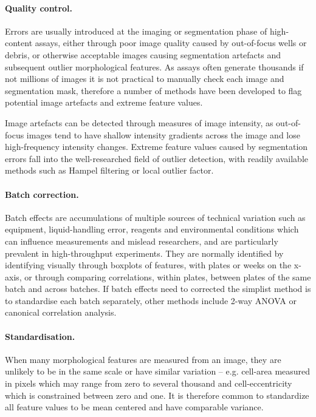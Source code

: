 \documentclass[a4paper,11pt,twoside,openright]{scrbook}
\begin{document}
\paragraph{\textbf{Quality control.}}
Errors are usually introduced at the imaging or segmentation phase of high-content assays, either through poor image quality caused by out-of-focus wells or debris, or otherwise acceptable images causing segmentation artefacts and subsequent outlier morphological features.
As assays often generate thousands if not millions of images it is not practical to manually check each image and segmentation mask, therefore a number of methods have been developed to flag potential image artefacts and extreme feature values.

Image artefacts can be detected through measures of image intensity, as out-of-focus images tend to have shallow intensity gradients across the image and lose high-frequency intensity changes. \cite{Bray2012}
Extreme feature values caused by segmentation errors fall into the well-researched field of outlier detection, with readily available methods such as Hampel filtering \cite{Hampel1974} or local outlier factor. \cite{Breunig2000}

\paragraph{Batch correction.}
Batch effects are accumulations of multiple sources of technical variation such as equipment, liquid-handling error, reagents and environmental conditions which can influence measurements and mislead researchers, and are particularly prevalent in high-throughput experiments.
They are normally identified by identifying visually through boxplots of features, with plates or weeks on the x-axis, or through comparing correlations, within plates, between plates of the same batch and across batches.
If batch effects need to corrected the simplist method is to standardise each batch separately, other methods include 2-way ANOVA \cite{Nygaard2016} or canonical correlation analysis. \cite{Vaisipour2014}

\paragraph{Standardisation.}
When many morphological features are measured from an image, they are unlikely to be in the same scale or have similar variation -- e.g. cell-area measured in pixels which may range from zero to several thousand and cell-eccentricity which is constrained between zero and one.
It is therefore common to standardize all feature values to be mean centered and have comparable variance.
\end{document}
